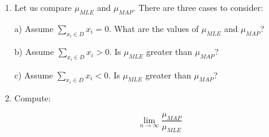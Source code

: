 \documentclass[submit]{harvardml}
\begin{document}
\begin{problem}
\begin{enumerate}
\item Let us compare $\mu_{MLE}$  and $\mu_{MAP}$. There are three cases to consider:

 a) Assume $\sum_{x_i \in D} x_i=0$. What are the values of $\mu_{MLE}$ and $\mu_{MAP}$?

 b) Assume $\sum_{x_i \in D} x_i>0$. Is $\mu_{MLE}$ greater than $\mu_{MAP}$?

 c) Assume $\sum_{x_i \in D} x_i<0$. Is $\mu_{MLE}$ greater than $\mu_{MAP}$?
  
    
\item Compute:

$$\lim_{n \rightarrow \infty} \frac{\mu_{MAP}}{\mu_{MLE}}$$

  \end{enumerate}

  \end{problem}
\end{document}
